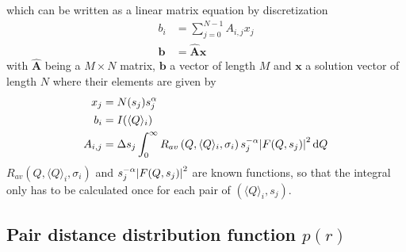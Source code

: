 which can be written as a linear matrix equation by discretization
\begin{align}
\label{eq:discreteFredholm}
b_i &= \sum_{j=0}^{N-1} A_{i,j} x_j \\
\label{eq:discreteFredholmVector}
\mathbf{b} &= \hat{\mathbf{A}}\mathbf{x}
\end{align}
with $\hat{\mathbf{A}}$ being a $M\times N$ matrix, $\mathbf{b}$ a vector of length $M$ and $\mathbf{x}$ a solution vector of length $N$ where their elements are given by
\begin{align}
x_j &= N(s_j) s_j^{\alpha}\\
b_i &= I(\langle Q\rangle_i) \\
A_{i,j} &= \Delta s_j \int_0^\infty R_{av}\left(Q,\langle Q\rangle_i,\sigma_i\right) s_j^{-\alpha} \abs{F(Q,s_j)}^2 \, \mathrm{d}Q  \label{eq:AijFF}
\end{align}
$R_{av}\left(Q,\langle Q\rangle_i,\sigma_i\right)$ and $s_j^{-\alpha}\abs{F(Q,s_j)}^2$ are known functions, so that the integral only has to be calculated once for each pair of $(\langle Q\rangle_i,s_j)$.


\subsection{Pair distance distribution function $p(r)$}~\\
\label{sec:p(r)}

